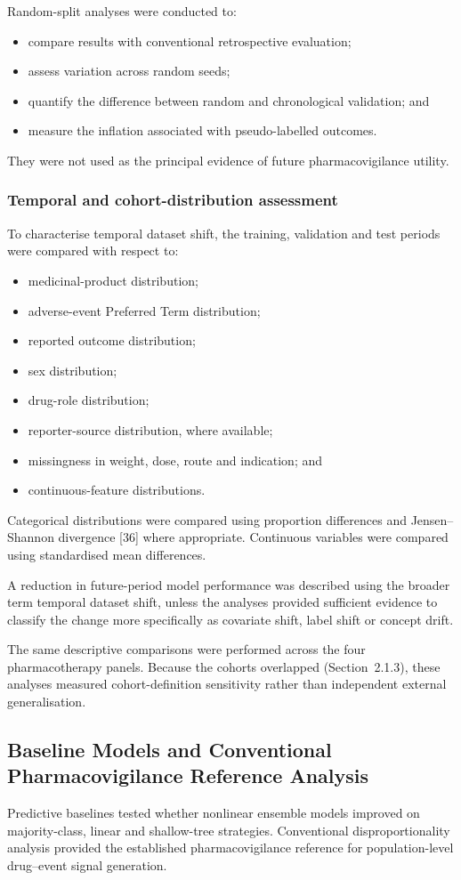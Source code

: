 \documentclass[10pt]{article}
\begin{document}
Random-split analyses were conducted to:
\begin{itemize}
\item compare results with conventional retrospective evaluation;
\item assess variation across random seeds;
\item quantify the difference between random and chronological validation; and
\item measure the inflation associated with pseudo-labelled outcomes.
\end{itemize}
They were not used as the principal evidence of future pharmacovigilance utility.

\subsubsection{Temporal and cohort-distribution assessment}
To characterise temporal dataset shift, the training, validation and test periods were compared with respect to:
\begin{itemize}
\item medicinal-product distribution;
\item adverse-event Preferred Term distribution;
\item reported outcome distribution;
\item sex distribution;
\item drug-role distribution;
\item reporter-source distribution, where available;
\item missingness in weight, dose, route and indication; and
\item continuous-feature distributions.
\end{itemize}
Categorical distributions were compared using proportion differences and Jensen--Shannon divergence [36] where appropriate. Continuous variables were compared using standardised mean differences.

A reduction in future-period model performance was described using the broader term temporal dataset shift, unless the analyses provided sufficient evidence to classify the change more specifically as covariate shift, label shift or concept drift.

The same descriptive comparisons were performed across the four pharmacotherapy panels. Because the cohorts overlapped (Section~2.1.3), these analyses measured cohort-definition sensitivity rather than independent external generalisation.

\subsection{Baseline Models and Conventional Pharmacovigilance Reference Analysis}
Predictive baselines tested whether nonlinear ensemble models improved on majority-class, linear and shallow-tree strategies. Conventional disproportionality analysis provided the established pharmacovigilance reference for population-level drug--event signal generation.
\end{document}
